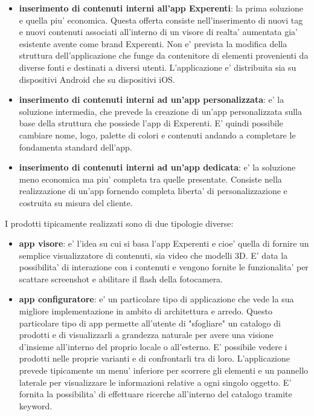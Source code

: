 \begin{itemize}
	\item \textbf{inserimento di contenuti interni all'app Experenti}: la prima soluzione e quella piu' economica. Questa offerta consiste nell'inserimento di nuovi tag e nuovi contenuti associati all'interno di un visore di realta' aumentata gia' esistente avente come brand Experenti. Non e' prevista la modifica della struttura dell'applicazione che funge da contenitore di elementi provenienti da diverse fonti e destinati a diversi utenti. L'applicazione e' distribuita sia su dispositivi Android che su dispositivi iOS.
	
	\item \textbf{inserimento di contenuti interni ad un'app personalizzata}: e' la soluzione intermedia, che prevede la creazione di un'app personalizzata sulla base della struttura che possiede l'app di Experenti. E' quindi possibile cambiare nome, logo, palette di colori e contenuti andando a completare le fondamenta standard dell'app.
	
	\item \textbf{inserimento di contenuti interni ad un'app dedicata}: e' la soluzione meno economica ma piu' completa tra quelle presentate. Consiste nella realizzazione di un'app fornendo completa liberta' di personalizzazione e costruita su misura del cliente.
\end{itemize}

I prodotti tipicamente realizzati sono di due tipologie diverse:
\begin{itemize}
	\item \textbf{app visore}: e' l'idea su cui si basa l'app Experenti e cioe' quella di fornire un semplice visualizzatore di contenuti, sia video che modelli 3D. E' data la possibilita' di interazione con i contenuti e vengono fornite le funzionalita' per scattare screenshot e abilitare il flash della fotocamera.
	
	\item \textbf{app configuratore}: e' un particolare tipo di applicazione che vede la sua migliore implementazione in ambito di architettura e arredo. Questo particolare tipo di app permette all'utente di "sfogliare" un catalogo di prodotti e di visualizzarli a grandezza naturale per avere una visione d'insieme all'interno del proprio locale o all'esterno. E' possibile vedere i prodotti nelle proprie varianti e di confrontarli tra di loro. L'applicazione prevede tipicamente un menu' inferiore per scorrere gli elementi e un pannello laterale per visualizzare le informazioni relative a ogni singolo oggetto. E' fornita la possibilita' di effettuare ricerche all'interno del catalogo tramite keyword.
\end{itemize}

